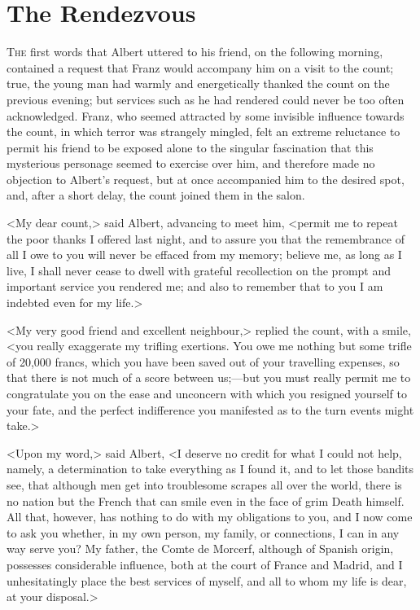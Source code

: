 \chapter{The Rendezvous} 

 \lettrine{T}{he} first words that Albert uttered to his friend, on the following morning, contained a request that Franz would accompany him on a visit to the count; true, the young man had warmly and energetically thanked the count on the previous evening; but services such as he had rendered could never be too often acknowledged. Franz, who seemed attracted by some invisible influence towards the count, in which terror was strangely mingled, felt an extreme reluctance to permit his friend to be exposed alone to the singular fascination that this mysterious personage seemed to exercise over him, and therefore made no objection to Albert's request, but at once accompanied him to the desired spot, and, after a short delay, the count joined them in the salon. 

 <My dear count,> said Albert, advancing to meet him, <permit me to repeat the poor thanks I offered last night, and to assure you that the remembrance of all I owe to you will never be effaced from my memory; believe me, as long as I live, I shall never cease to dwell with grateful recollection on the prompt and important service you rendered me; and also to remember that to you I am indebted even for my life.> 

 <My very good friend and excellent neighbour,> replied the count, with a smile, <you really exaggerate my trifling exertions. You owe me nothing but some trifle of 20,000 francs, which you have been saved out of your travelling expenses, so that there is not much of a score between us;—but you must really permit me to congratulate you on the ease and unconcern with which you resigned yourself to your fate, and the perfect indifference you manifested as to the turn events might take.> 

 <Upon my word,> said Albert, <I deserve no credit for what I could not help, namely, a determination to take everything as I found it, and to let those bandits see, that although men get into troublesome scrapes all over the world, there is no nation but the French that can smile even in the face of grim Death himself. All that, however, has nothing to do with my obligations to you, and I now come to ask you whether, in my own person, my family, or connections, I can in any way serve you? My father, the Comte de Morcerf, although of Spanish origin, possesses considerable influence, both at the court of France and Madrid, and I unhesitatingly place the best services of myself, and all to whom my life is dear, at your disposal.> 

